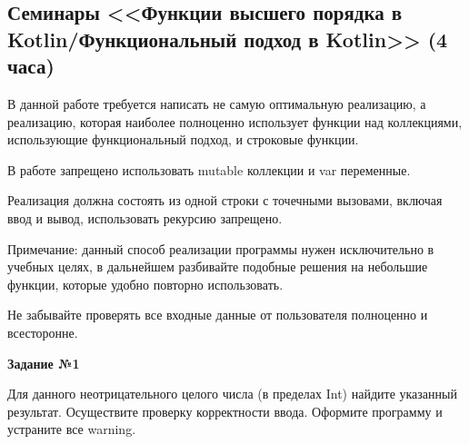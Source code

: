 \subsection{Семинары <<Функции высшего порядка в Kotlin/Функциональный подход в Kotlin>> (4 часа)}
В данной работе требуется написать не самую оптимальную реализацию, а реализацию, 
которая наиболее полноценно использует функции над
коллекциями, использующие функциональный подход, и строковые функции. 

В работе запрещено использовать mutable коллекции и var переменные.

Реализация должна состоять из одной строки с точечными вызовами, включая ввод и вывод, использовать рекурсию запрещено.

Примечание: данный способ реализации программы нужен исключительно в учебных целях, в дальнейшем разбивайте подобные решения на небольшие функции,
которые удобно повторно использовать.

Не забывайте проверять все входные данные от пользователя полноценно и всесторонне.

\textbf{Задание №1}

Для данного неотрицательного целого числа (в пределах Int)
найдите указанный результат. Осуществите проверку 
корректности ввода. Оформите программу и устраните все warning.

